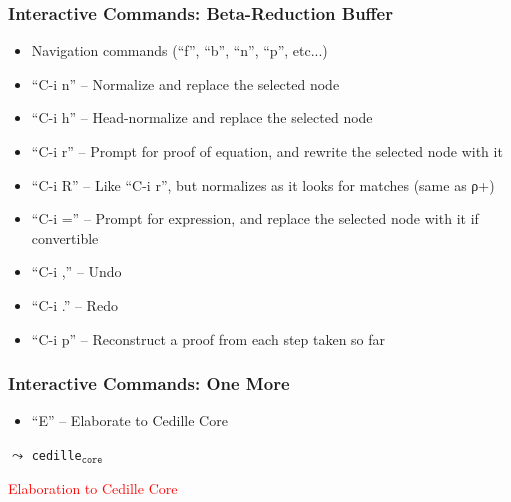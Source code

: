 \documentclass[11pt]{beamer}
\begin{document}
\begin{frame}
\frametitle{Interactive Commands: Beta-Reduction Buffer}
\begin{itemize}
\item Navigation commands (``f'', ``b'', ``n'', ``p'', etc...)
\pause
\item ``C-i n'' -- Normalize and replace the selected node
\item ``C-i h'' -- Head-normalize and replace the selected node
\pause
\item ``C-i r'' -- Prompt for proof of equation, and rewrite the selected node with it
\item ``C-i R'' -- Like ``C-i r'', but normalizes as it looks for matches (same as ρ+)
\pause
\item ``C-i ='' -- Prompt for expression, and replace the selected node with it if convertible
\pause
\item ``C-i ,'' -- Undo
\item ``C-i .'' -- Redo
\pause
\item ``C-i p'' -- Reconstruct a proof from each step taken so far
\pause
\end{itemize}

\end{frame}



\begin{frame}

\frametitle{Interactive Commands: One More}
\begin{itemize}
\item ``E'' -- Elaborate to Cedille Core
\end{itemize}
\end{frame}

\begin{frame}

\begin{center}

{\Huge $\leadsto$ \texttt{cedille}$_{\texttt{core}}$}

\vspace{1cm}

{\Large \textcolor{red}{Elaboration to Cedille Core}}

\end{center}

\end{frame}
\end{document}
